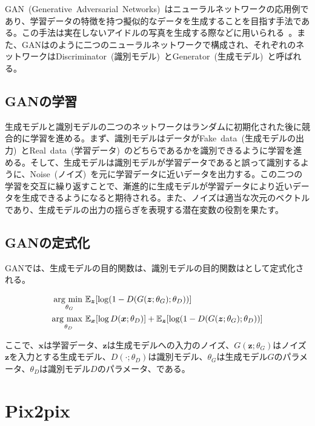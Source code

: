 GAN~(Generative~Adversarial~Networks)~\cite{GAN}はニューラルネットワークの応用例であり、学習データの特徴を持つ擬似的なデータを生成することを目指す手法である。この手法は実在しないアイドルの写真を生成する際などに用いられる~\cite{idol}。また、GANはのように二つのニューラルネットワークで構成され、それぞれのネットワークはDiscriminator~(識別モデル)~とGenerator~(生成モデル)~と呼ばれる。

\subsection{GANの学習}

生成モデルと識別モデルの二つのネットワークはランダムに初期化された後に競合的に学習を進める。まず、識別モデルはデータがFake~data~(生成モデルの出力)~とReal~data~(学習データ)~のどちらであるかを識別できるように学習を進める。そして、生成モデルは識別モデルが学習データであると誤って識別するように、Noise~(ノイズ)~を元に学習データに近いデータを出力する。この二つの学習を交互に繰り返すことで、漸進的に生成モデルが学習データにより近いデータを生成できるようになると期待される。また、ノイズは適当な次元のベクトルであり、生成モデルの出力の揺らぎを表現する潜在変数の役割を果たす。

\clearpage

\subsection{GANの定式化}

GANでは、生成モデルの目的関数は、識別モデルの目的関数はとして定式化される。

\begin{align}
    \label{eq:GAN_G}
    \mathop{\mathrm{arg~min~}}\limits _{\theta_G}& \mathbb{E}_{\boldsymbol{z}}[\log (1-D(G(\boldsymbol{z};\theta_G);\theta_D))]\\
    \label{eq:GAN_D}
    \mathop{\mathrm{arg~max~}}\limits _{\theta_D}& \mathbb{E}_{\boldsymbol{x}}[\log D(\boldsymbol{x};\theta_D)]+\mathbb{E}_{\boldsymbol{z}}[\log (1-D(G(\boldsymbol{z};\theta_G);\theta_D))]
\end{align}


ここで、$\boldsymbol{x}$は学習データ、$\boldsymbol{z}$は生成モデルへの入力のノイズ、$G(\boldsymbol{z};\theta_G)$はノイズ$\boldsymbol{z}$を入力とする生成モデル、$D(\cdot;\theta_D)$は識別モデル、$\theta_G$は生成モデル$G$のパラメータ、$\theta_D$は識別モデル$D$のパラメータ、である。

\section{Pix2pix}

